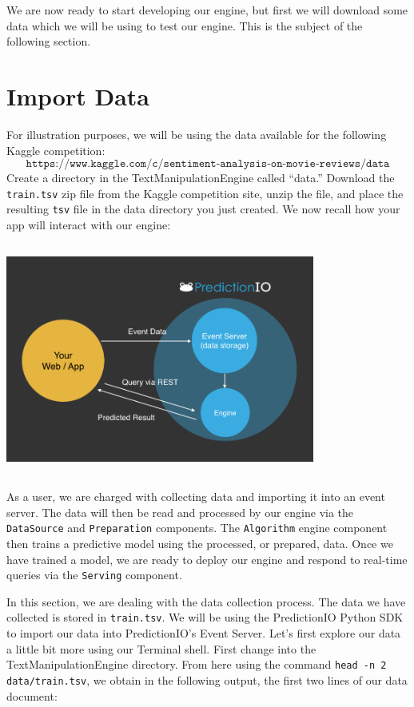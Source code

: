 \documentclass[a4paper,12pt]{article}
\renewcommand{\tt}[1]{\texttt{#1}}
\newcommand{\3}{\left}
\newcommand{\4}{\right}
\renewcommand{\-}[1]{{}^{-#1}}
\begin{document}
We are now ready to start developing our engine, but first we will download some data which we will be using to test our engine. This is the subject of the following section.

\section*{Import Data}

For illustration purposes, we will be using the data available for the following Kaggle competition:
$$
\tt{https://www.kaggle.com/c/sentiment-analysis-on-movie-reviews/data}
$$
Create a directory in the TextManipulationEngine called \enquote{data.} Download the \tt{train.tsv} zip file from the Kaggle competition site, unzip the file, and place the resulting \tt{tsv} file in the data directory you just created. We now recall how your app will interact with our engine:

\begin{center}
\vspace{0.6cm}
\includegraphics[width=4in, height=3in, keepaspectratio=true, trim=0em 3em 0em 3em]{img3.png}
\end{center}
\vspace{0.5cm}


As a user, we are charged with collecting data and importing it into an event server. The data will then be read and processed by our engine via the \tt{DataSource} and \tt{Preparation} components. The \tt{Algorithm} engine component then trains a predictive model using the processed, or prepared, data. Once we have trained a model, we are ready to deploy our engine and respond to real-time queries via the \tt{Serving} component.

In this section, we are dealing with the data collection process. The data we have collected is stored in \tt{train.tsv}. We will be using the PredictionIO Python SDK to import our data into PredictionIO's Event Server. Let's first explore our data a little bit more using our Terminal shell. First change into the TextManipulationEngine directory. From here using the command \tt{head -n 2 data/train.tsv}, we obtain in the following output, the first two lines of our data document:
\end{document}
